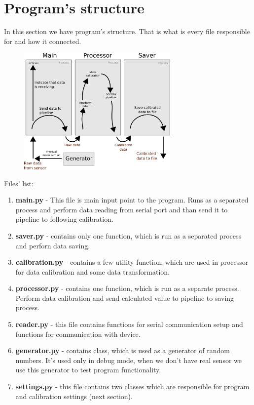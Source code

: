 \documentclass[12pt]{article}
\begin{document}
\section{Program's structure}
\par In this section we have program's structure. That is  what is every file
responsible for and how it connected.
\begin{figure}[htb!]
    \centering
    \includegraphics[width=0.7\textwidth]{./structure_v3.eps}
\end{figure}

\par Files' list:
\begin{enumerate}
    \item \textbf{main.py} - This file is main input point to the program.
        Runs as a separated process and perform data reading from serial port 
        and than send it to pipeline to following calibration. 
    \item \textbf{saver.py} - contains only one function, which is run as a
        separated process and perforn data saving. 
    \item \textbf{calibration.py} - contains a few utility function, which are
        used in processor for data calibration and some data transformation. 
    \item \textbf{processor.py} - contains one function, which is run as a
        separate process. Perform data calibration and send calculated value to
        pipeline to saving process.
    \item \textbf{reader.py} - this file contains functions for serial
        communication setup and functions for communication with device. 
    \item \textbf{generator.py} - contains class, which is used as a generator
        of random numbers. It's used only in debug mode, when we don't have real
        sensor we use this generator to test program functionality.
    \item \textbf{settings.py} - this file contains two classes which are
        responsible for program and calibration settings (next section).
\end{enumerate}
\end{document}
